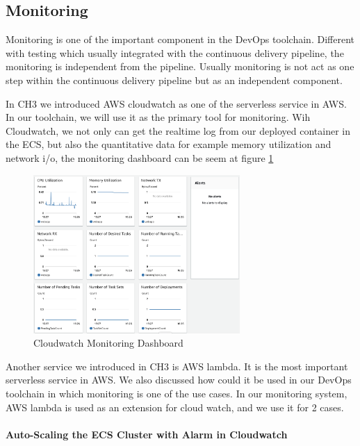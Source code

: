 \subsection{Monitoring}
Monitoring is one of the important component in the DevOps toolchain. Different with testing which usually integrated with the continuous delivery pipeline, the monitoring is independent from the pipeline. Usually monitoring is not act as one step within the continuous delivery pipeline but as an independent component.
\par
In CH3 we introduced AWS cloudwatch as one of the serverless service in AWS. In our toolchain, we will use it as the primary tool for monitoring. Wih Cloudwatch, we not only can get the realtime log from our deployed container in the ECS, but also the quantitative data for example memory utilization and network i/o, the monitoring dashboard can be seem at figure \ref{fig:monitoring}
\begin{figure}[h]
    \centering
    \includegraphics[width=0.70\textwidth]{pics/monitoring.png}
    \caption{Cloudwatch Monitoring Dashboard}
    \label{fig:monitoring}
\end{figure}
Another service we introduced in CH3 is AWS lambda. It is the most important serverless service in AWS. We also discussed how could it be used in our DevOps toolchain in which monitoring is one of the use cases. In our monitoring system, AWS lambda is used as an extension for cloud watch, and we use it for 2 cases.
\paragraph[]{Auto-Scaling the ECS Cluster with Alarm in Cloudwatch}

